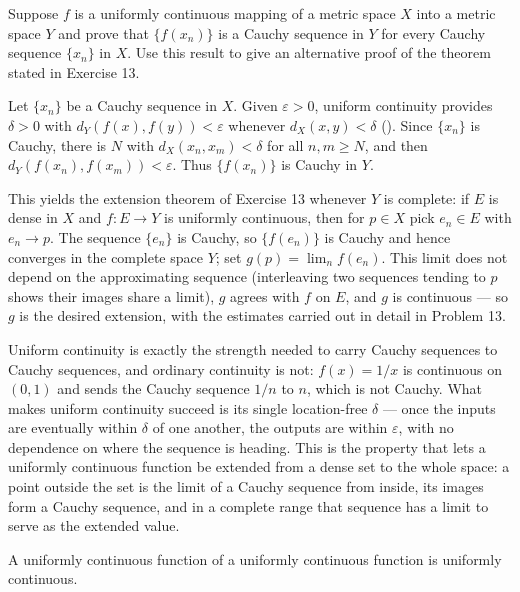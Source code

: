 \documentclass[main.tex]{subfiles}
\begin{document}
Suppose $f$ is a uniformly continuous mapping of a metric space $X$ into a metric space $Y$ and prove that $\{f(x_{n})\}$ is a Cauchy sequence in $Y$ for every Cauchy sequence $\{x_{n}\}$ in $X$. Use this result to give an alternative proof of the theorem stated in Exercise 13.
\begin{SolutionBlue}
Let $\{x_{n}\}$ be a Cauchy sequence in $X$. Given $\varepsilon > 0$, uniform continuity provides $\delta > 0$ with $d_{Y}(f(x), f(y)) < \varepsilon$ whenever $d_{X}(x, y) < \delta$ (). Since $\{x_{n}\}$ is Cauchy, there is $N$ with $d_{X}(x_{n}, x_{m}) < \delta$ for all $n, m \ge N$, and then $d_{Y}(f(x_{n}), f(x_{m})) < \varepsilon$. Thus $\{f(x_{n})\}$ is Cauchy in $Y$.

This yields the extension theorem of Exercise 13 whenever $Y$ is complete: if $E$ is dense in $X$ and $f : E \to Y$ is uniformly continuous, then for $p \in X$ pick $e_{n} \in E$ with $e_{n} \to p$. The sequence $\{e_{n}\}$ is Cauchy, so $\{f(e_{n})\}$ is Cauchy and hence converges in the complete space $Y$; set $g(p) = \lim_{n} f(e_{n})$. This limit does not depend on the approximating sequence (interleaving two sequences tending to $p$ shows their images share a limit), $g$ agrees with $f$ on $E$, and $g$ is continuous --- so $g$ is the desired extension, with the estimates carried out in detail in Problem 13.
\end{SolutionBlue}
\begin{Reflection}
Uniform continuity is exactly the strength needed to carry Cauchy sequences to Cauchy sequences, and ordinary continuity is not: $f(x) = 1/x$ is continuous on $(0, 1)$ and sends the Cauchy sequence $1/n$ to $n$, which is not Cauchy. What makes uniform continuity succeed is its single location-free $\delta$ --- once the inputs are eventually within $\delta$ of one another, the outputs are within $\varepsilon$, with no dependence on where the sequence is heading. This is the property that lets a uniformly continuous function be extended from a dense set to the whole space: a point outside the set is the limit of a Cauchy sequence from inside, its images form a Cauchy sequence, and in a complete range that sequence has a limit to serve as the extended value.
\end{Reflection}

A uniformly continuous function of a uniformly continuous function is uniformly continuous.
\end{document}
